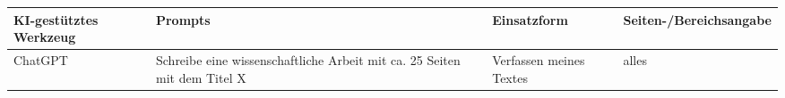 
\begin{tabularx}{\textwidth}{|X|X|X|X|}
    \hline
    \textbf{KI-gestütztes Werkzeug} & \textbf{Prompts} & \textbf{Einsatzform} & \textbf{Seiten-/Bereichsangabe} \\
    \hline
    ChatGPT & Schreibe eine wissenschaftliche Arbeit mit ca. 25 Seiten mit dem Titel X & Verfassen meines Textes & alles \\
    \hline
\end{tabularx}